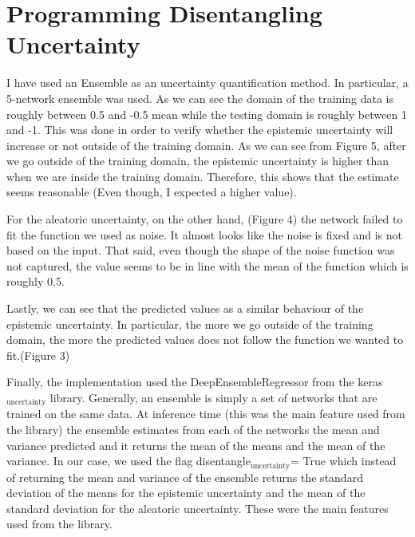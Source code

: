 \documentclass[11pt]{article}
\begin{document}
\section{Programming Disentangling Uncertainty}
\label{sec:org309bfc6}
I have used an Ensemble as an uncertainty quantification method.
In particular, a 5-network ensemble was used.
As we can see the domain of the training data is roughly between 0.5
and -0.5 mean while the testing domain is roughly between 1 and
-1.
This was done in order to verify whether the epistemic uncertainty
will increase or not outside of the training domain.
As we can see from Figure 5, after we go outside of the training
domain, the epistemic uncertainty is higher than when we are inside
the training domain. Therefore, this shows that the estimate seems
reasonable (Even though, I expected a higher value).

For the aleatoric uncertainty, on the other hand, (Figure 4) the
network failed to fit the function we used as noise. It almost looks
like the noise is fixed and is not based on the input. That said, even
though the shape of the noise function was not captured, the value
seems to be in line with the mean of the function which is roughly
0.5.

Lastly, we can see that the predicted values as a similar behaviour of
the epistemic uncertainty. In particular, the more we go outside of
the training domain, the more the predicted values does not follow the
function we wanted to fit.(Figure 3)

Finally, the implementation used the DeepEnsembleRegressor from the
keras\(_{\text{uncertainty}}\) library. Generally, an ensemble is simply a set of
networks that are trained on the same data. At inference time (this
was the main feature used from the library) the ensemble estimates
from each of the networks the mean and variance predicted and it
returns the mean of the means and the mean of the variance. In our
case, we used the flag disentangle\(_{\text{uncertainty}}\)= True which instead of
returning the mean and variance of the ensemble returns the
standard deviation of the means for the epistemic uncertainty and the
mean of the standard deviation for the aleatoric uncertainty. These
were the main features used from the library.
\end{document}
